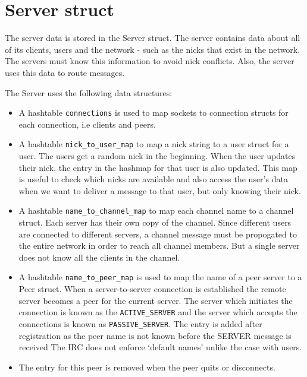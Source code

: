 \documentclass[letterpaper,twocolumn,10pt]{article}
\begin{document}
\section{Server struct}

The server data is stored in the Server struct. The server contains data about
all of its clients, users and the network - such as the nicks that exist in the
network. The servers must know this information to avoid nick conflicts. Also,
the server uses this data to route messages.

The Server uses the following data structures:

\begin{itemize}

	\item A hashtable \verb|connections| is used to map sockets to connection
	      structs
	      for each connection, i.e clients and peers.
	\item A hashtable \verb|nick_to_user_map| to map a nick string to a user
	      struct for
	      a user. The users get a random nick in the beginning. When the user
	      updates
	      their nick, the entry in the hashmap for that user is also updated.
	      This map is
	      useful to check which nicks are available and also access the user's
	      data when
	      we want to deliver a message to that user, but only knowing their nick.
	\item A hashtable \verb|name_to_channel_map| to map each channel name to a
	      channel
	      struct. Each server has their own copy of the channel. Since different
	      users
	      are connected to different servers, a channel message must be
	      propogated to the
	      entire network in order to reach all channel members. But a single
	      server does
	      not know all the clients in the channel.
	\item A hashtable \verb|name_to_peer_map| is used to map the name of a peer
	      server
	      to a Peer struct. When a server-to-server connection is established the
	      remote
	      server becomes a peer for the current server. The server which
	      initiates the
	      connection is known as the \verb|ACTIVE_SERVER| and the server which
	      accepts the
	      connections is known as \verb|PASSIVE_SERVER|. The entry is added after
	      registration
	      as the peer name is not known before the SERVER message is received
	      The IRC does not enforce `default names' unlike the case with users.
	\item The entry for this peer is removed when the peer quits or disconnects.

\end{itemize}
\end{document}
